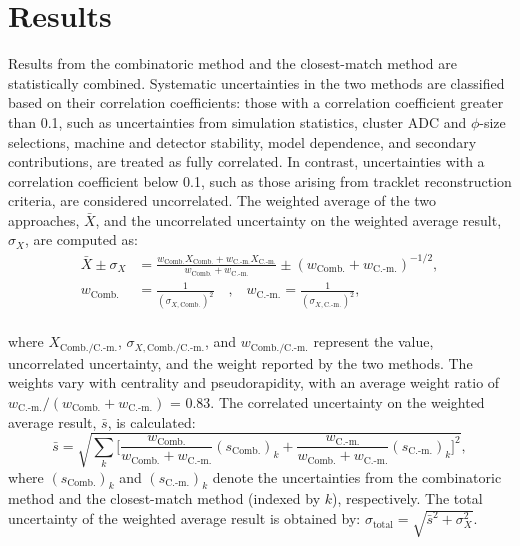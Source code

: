 \section{Results}
\label{sec:results}
Results from the combinatoric method and the closest-match method are statistically combined. Systematic uncertainties in the two methods are classified based on their correlation coefficients: those with a correlation coefficient greater than 0.1, such as uncertainties from simulation statistics, cluster ADC and $\phi$-size selections, machine and detector stability, model dependence, and secondary contributions, are treated as fully correlated. In contrast, uncertainties with a correlation coefficient below 0.1, such as those arising from tracklet reconstruction criteria, are considered uncorrelated. 
The weighted average of the two approaches, $\bar{X}$, and the uncorrelated uncertainty on the weighted average result, $\sigma_X$, are computed as:  
\begin{equation}
\begin{split}
\bar{X} \pm \sigma_X & = \frac{ w_{\text{Comb.}} X_{\text{Comb.}} + w_{\text{C.-m.}} X_{\text{C.-m.}}}{w_{\text{Comb.}} + w_{\text{C.-m.}}} \pm \left(w_{\text{Comb.}} + w_{\text{C.-m.}} \right)^{-1/2}, \\ 
 w_{\text{Comb.}} & = \frac{1}{(\sigma_{X,\text{Comb.}})^2}\quad \text{,}\quad w_{\text{C.-m.}} = \frac{1}{(\sigma_{X,\text{C.-m.}})^2}, \\
\end{split}
\label{eq:weiavg-uncorrunc}
\end{equation}

where \(X_\text{Comb./C.-m.}\), \(\sigma_{X,\text{Comb./C.-m.}}\), and $w_{\text{Comb./C.-m.}}$ represent the value, uncorrelated uncertainty, and the weight reported by the two methods. The weights vary with centrality and pseudorapidity, with an average weight ratio of $w_{\text{C.-m.}} / (w_{\text{Comb.}} + w_{\text{C.-m.}})$ = 0.83.
The correlated uncertainty on the weighted average result, $\bar{s}$, is calculated:  
\begin{equation}
\bar{s} = \sqrt{\sum_k \bigg[\frac{w_{\text{Comb.}}}{w_{\text{Comb.}}+w_{\text{C.-m.}}}(s_{\text{Comb.}})_k + \frac{w_{\text{C.-m.}}}{w_{\text{Comb.}}+w_{\text{C.-m.}}}(s_{\text{C.-m.}})_k\bigg]^2},
\label{eq:corrunc}
\end{equation}
where $(s_{\text{Comb.}})_{k}$ and $(s_{\text{C.-m.}})_{k}$ denote the uncertainties from the combinatoric method and the closest-match method (indexed by $k$), respectively. The total uncertainty of the weighted average result is obtained by:  
\begin{math}
\sigma_{\text{total}} = \sqrt{\bar{s}^2 + \sigma_X^2}.
\end{math} 

